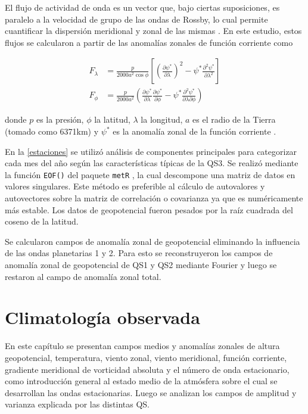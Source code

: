 \documentclass[spanish,a4paper,12pt,oneside]{book}
\begin{document}
El flujo de actividad de onda es un vector que, bajo ciertas
suposiciones, es paralelo a la velocidad de grupo de las ondas de
Rossby, lo cual permite cuantificar la dispersión meridional y zonal de
las mismas \citep{James}. En este estudio, estos flujos se calcularon a
partir de las anomalías zonales de función corriente como

\[
\begin{aligned}
F_\lambda &= \frac{p}{2000a^2\cos\phi}\left[ \left( \frac{\partial \psi^*}{\partial \lambda} \right)^2 - \psi^*\frac{\partial^2 \psi^*}{\partial \lambda^2}  \right] \\
F_\phi &= \frac{p}{2000a^2} \left( \frac{\partial \psi^*}{\partial \lambda}\frac{\partial \psi^*}{\partial \phi}  - \psi^* \frac{\partial^2 \psi^*}{\partial \lambda \partial \phi} \right) 
\end{aligned}
\]

donde \(p\) es la presión, \(\phi\) la latitud, \(\lambda\) la longitud,
\(a\) es el radio de la Tierra (tomado como 6371km) y \(\psi^*\) es la
anomalía zonal de la función corriente \citep{Vera2004}.

En la \autoref{estaciones} se utilizó análisis de componentes
principales para categorizar cada mes del año según las características
típicas de la QS3. Se realizó mediante la función \texttt{EOF()} del
paquete \texttt{metR} \citep{R-metR}, la cual descompone una matriz de
datos en valores singulares. Este método es preferible al cálculo de
autovalores y autovectores sobre la matriz de correlación o covarianza
ya que es numéricamente más estable. Los datos de geopotencial fueron
pesados por la raíz cuadrada del coseno de la latitud.

Se calcularon campos de anomalía zonal de geopotencial eliminando la
influencia de las ondas planetarias 1 y 2. Para esto se reconstruyeron
los campos de anomalía zonal de geopotencial de QS1 y QS2 mediante
Fourier y luego se restaron al campo de anomalía zonal total.

\chapter{Climatología observada}\label{climatologia-observada}

En este capítulo se presentan campos medios y anomalías zonales de
altura geopotencial, temperatura, viento zonal, viento meridional,
función corriente, gradiente meridional de vorticidad absoluta y el
número de onda estacionario, como introducción general al estado medio
de la atmósfera sobre el cual se desarrollan las ondas estacionarias.
Luego se analizan los campos de amplitud y varianza explicada por las
distintas QS.
\end{document}

